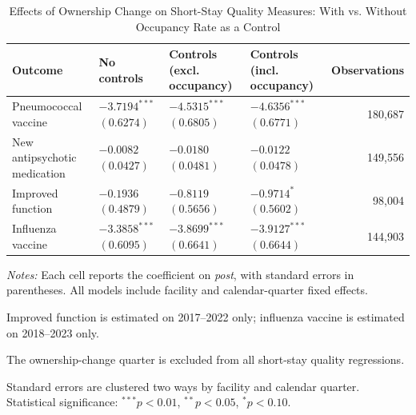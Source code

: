 \documentclass[12pt]{article}
\begin{document}
\vspace{1em}


\begin{table}[H]
\centering
\begin{threeparttable}
\caption{Effects of Ownership Change on Short-Stay Quality Measures: With vs. Without Occupancy Rate as a Control}
\label{tab:quality-occupancy-control}
\small
\setlength{\tabcolsep}{6pt}
\begin{tabularx}{\textwidth}{@{} l Y Y Y r @{}}
\toprule
Outcome & No controls & Controls (excl. occupancy) & Controls (incl. occupancy) & Observations \\
\midrule
Pneumococcal vaccine &  &  &  & 180,687 \\
New antipsychotic medication &  &  &  & 149,556 \\
Improved function &  &  &  & 98,004 \\
Influenza vaccine &  &  &  & 144,903 \\
\bottomrule
\end{tabularx}

\begin{tablenotes}[flushleft]
\footnotesize
\item \textit{Notes:} Each cell reports the coefficient on \textit{post}, with standard errors in parentheses. All models include facility and calendar-quarter fixed effects.
\item Improved function is estimated on 2017--2022 only; influenza vaccine is estimated on 2018--2023 only.
\item The ownership-change quarter is excluded from all short-stay quality regressions.
\item Standard errors are clustered two ways by facility and calendar quarter. Statistical significance: $^{***}p<0.01$, $^{**}p<0.05$, $^{*}p<0.10$.
\end{tablenotes}
\end{threeparttable}
\end{table}
\end{document}
